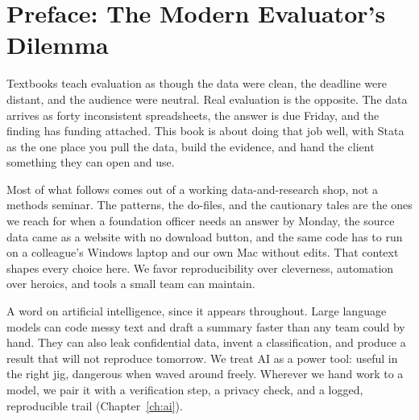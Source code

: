 \documentclass[
    a4paper,
    fontsize=10pt,
    twoside=true,
    numbers=noenddot,
]{kaobook}
\begin{document}
\mainmatter
{}

\chapter*{Preface: The Modern Evaluator's Dilemma}

\begin{fullwidthpar}
Textbooks teach evaluation as though the data were clean, the deadline were distant, and the audience were neutral. Real evaluation is the opposite. The data arrives as forty inconsistent spreadsheets, the answer is due Friday, and the finding has funding attached. This book is about doing that job well, with Stata as the one place you pull the data, build the evidence, and hand the client something they can open and use.
\end{fullwidthpar}

Most of what follows comes out of a working data-and-research shop, not a methods seminar. The patterns, the do-files, and the cautionary tales are the ones we reach for when a foundation officer needs an answer by Monday, the source data came as a website with no download button, and the same code has to run on a colleague's Windows laptop and our own Mac without edits. That context shapes every choice here. We favor reproducibility over cleverness, automation over heroics, and tools a small team can maintain.

A word on artificial intelligence, since it appears throughout. Large language models can code messy text and draft a summary faster than any team could by hand. They can also leak confidential data, invent a classification, and produce a result that will not reproduce tomorrow. We treat AI as a power tool: useful in the right jig, dangerous when waved around freely. Wherever we hand work to a model, we pair it with a verification step, a privacy check, and a logged, reproducible trail (Chapter~\ref{ch:ai}).
\end{document}
